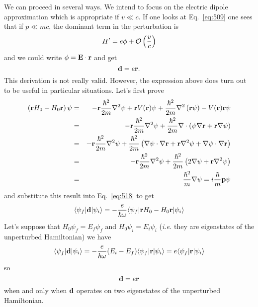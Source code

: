 We can proceed in several ways.   We intend to focus on the electric 
dipole approximation which is appropriate if $v\ll c$.  If one looks
at Eq.~\ref{eq:509} one sees that if $p \ll mc$, the dominant term in the
perturbation is 
\begin{equation}
H' = e\phi + {\cal O}\left ( \frac{v}{c} \right )
\label{eq:517}
\end{equation}
and we could write $\phi={\bf E} \cdot {\bf r}$ and get
\begin{equation}
{\bf d} = e {\bf r}.
\label{eq:518}
\end{equation}
This derivation is not really valid.  However, the expression above
does turn out to be useful in particular situations.  Let's first
prove
\begin{eqnarray}
\left ( {\bf r} H_0 - H_0 {\bf r} \right ) \psi &=&
- {\bf r} \frac{\hbar^2}{2m} \nabla^2 \psi + {\bf r} V({\bf r})\psi
+ \frac{\hbar^2}{2m} \nabla^2 \left ( {\bf r} \psi \right ) -
V({\bf r}) {\bf r} \psi \\
&=&
- {\bf r} \frac{\hbar^2}{2m} \nabla^2 \psi 
+ \frac{\hbar^2}{2m} \nabla \cdot \left ( \psi \nabla {\bf r} + {\bf
  r} \nabla \psi \right ) \\
&=&
- {\bf r} \frac{\hbar^2}{2m} \nabla^2 \psi 
+ \frac{\hbar^2}{2m}  \left ( \nabla  \psi \cdot \nabla {\bf r} 
+ {\bf r} \nabla^2 \psi + \nabla \psi \cdot \nabla {\bf r} \right ) \\
&=&
- {\bf r} \frac{\hbar^2}{2m} \nabla^2 \psi 
+ \frac{\hbar^2}{2m}  \left ( 2 \nabla \psi + {\bf r} \nabla^2 \psi
\right ) \\
&=& \frac{\hbar^2}{m} \nabla \psi = i\frac{\hbar}{m} {\bf p} \psi
\label{eq:519}
\end{eqnarray}
and substitute this result into Eq.~\ref{eq:518} to get
\begin{equation}
\langle \psi_f | {\bf d} | \psi_i \rangle =
-\frac{e}{\hbar\omega} \langle \psi_f | {\bf r} H_0 - H_0 {\bf r} |
\psi_i \rangle
\label{eq:520}
\end{equation}
Let's suppose that $H_0 \psi_f= E_f \psi_f$ and $H_0 \psi_i = E_i
\psi_i$ ({\em i.e.} they are eigenstates of the unperturbed
Hamiltonian) we have
\begin{equation}
\langle \psi_f | {\bf d} | \psi_i \rangle =
-\frac{e}{\hbar\omega} (E_i - E_f) \langle \psi_f | {\bf r} |
\psi_i \rangle = e \langle \psi_f | {\bf r} |
\psi_i \rangle
\label{eq:521}
\end{equation}
so 
\begin{equation}
{\bf d} = e {\bf r}
\label{eq:522}
\end{equation}
when and only when ${\bf d}$ operates on two eigenstates of the
unperturbed Hamiltonian.



